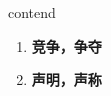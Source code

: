 
\begin{frame}
{\huge contend}
\begin{center}
\begin{enumerate}\Large
  \item \textbf{竞争，争夺}
  \item \textbf{声明，声称}
\end{enumerate}
\end{center}
\end{frame}
